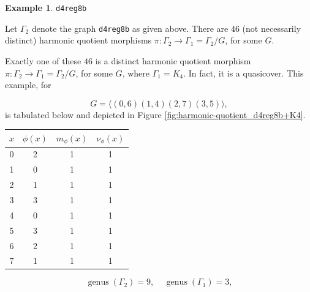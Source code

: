 \documentclass[12pt,letterpaper]{article}
\theoremstyle{definition}
\newtheorem{example}[theorem]{Example}
\DeclareMathOperator{\genus}{genus}
\begin{document}
\begin{example}%
\label{example:d4reg8b}
 {\tt d4reg8b}\newline
{\rm  
  Let $\Gamma_2$ denote the graph {\tt d4reg8b} as given above.
There are $46$ (not necessarily distinct) harmonic quotient morphisms
$\pi: \Gamma_2\to \Gamma_1=\Gamma_2/G$,
for some $G$.

Exactly one of these $46$ is a distinct harmonic quotient morphism
$\pi: \Gamma_2\to \Gamma_1=\Gamma_2/G$,
for some $G$, where $\Gamma_1=K_4$. In fact, it is a quasicover.
This example, for

\[
G = \langle (0,6)(1,4)(2,7)(3,5)  \rangle,
\]
is tabulated below and depicted in Figure \ref{fig:harmonic-quotient_d4reg8b+K4}.

\begin{center}
\begin{tabular}{c|c|c|c}  
  $x$ & $\phi(x)$ & $m_\phi(x)$ & $\nu_\phi(x)$ \\ \hline
  0   &    2   &        1         &  1   \\ 
  1   &    0   &        1         &  1  \\ 
  2   &    1   &        1         &  1  \\ 
  3   &    3   &        1         &  1  \\ 
  4   &    0   &        1         &  1   \\
  5   &    3   &        1         &  1   \\
  6   &    2   &        1         &  1   \\
  7   &    1   &        1         &  1   \\     
\end{tabular}
\end{center}

\[
  \genus(\Gamma_2) =9,\ \ \ \ \
  \genus(\Gamma_1) =3,
\]

}
\end{example}
\end{document}
